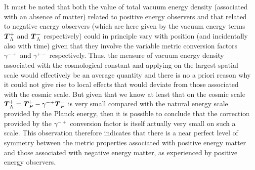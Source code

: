 \documentclass[notitlepage,12pt]{report}
\newcommand{\bm}[1]{\mbox{\boldmath $#1$}}
\begin{document}
It must be noted that both the value of total vacuum energy density (associated with an absence of matter) related to positive energy observers and that related to negative energy observers (which are here given by the vacuum energy terms $\bm{T}_{\Lambda}^+$ and $\bm{T}_{\Lambda}^-$ respectively) could in principle vary with position (and incidentally also with time) given that they involve the variable metric conversion factors $\gamma^{-+}$ and $\gamma^{+-}$ respectively. Thus, the measure of vacuum energy density associated with the cosmological constant and applying on the largest spatial scale would effectively be an average quantity and there is no a priori reason why it could not give rise to local effects that would deviate from those associated with the cosmic scale. But given that we know at least that on the cosmic scale $\bm{T}_{\Lambda}^+=\bm{T}_P^{+}-\gamma^{-+}\bm{T}_P^{-}$ is very small compared with the natural energy scale provided by the Planck energy, then it is possible to conclude that the correction provided by the $\gamma^{-+}$ conversion factor is itself actually very small on such a scale. This observation therefore indicates that there is a near perfect level of symmetry between the metric properties associated with positive energy matter and those associated with negative energy matter, as experienced by positive energy observers.

\bigskip
\end{document}
